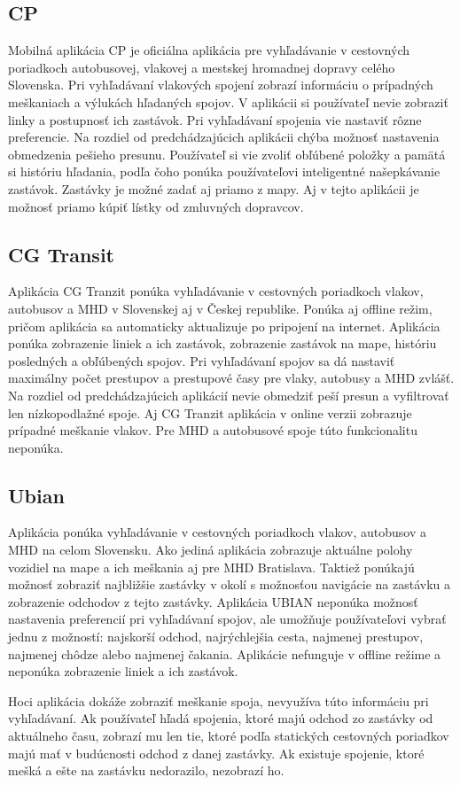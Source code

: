 \subsection{CP}
Mobilná aplikácia CP je oficiálna aplikácia pre vyhľadávanie v cestovných poriadkoch autobusovej, vlakovej a mestskej hromadnej dopravy celého Slovenska.  Pri vyhľadávaní vlakových spojení zobrazí informáciu o prípadných meškaniach a výlukách hľadaných spojov. V aplikácii si používateľ nevie zobraziť linky a postupnosť ich zastávok. Pri vyhľadávaní spojenia vie nastaviť rôzne preferencie. Na rozdiel od predchádzajúcich aplikácii chýba možnosť nastavenia obmedzenia pešieho presunu. Používateľ si vie zvoliť obľúbené položky a pamätá si históriu hľadania, podľa čoho ponúka používateľovi inteligentné našepkávanie zastávok. Zastávky je možné zadať aj priamo z mapy. Aj v tejto aplikácii je možnosť priamo kúpiť lístky od zmluvných dopravcov.

\subsection{CG Transit}
Aplikácia CG Tranzit ponúka vyhľadávanie v cestovných poriadkoch vlakov, autobusov a MHD v Slovenskej aj v Českej republike. Ponúka aj offline režim, pričom aplikácia sa automaticky aktualizuje po pripojení na internet. Aplikácia ponúka zobrazenie liniek a ich zastávok, zobrazenie zastávok na mape, históriu posledných a obľúbených spojov. Pri vyhľadávaní spojov sa dá nastaviť maximálny počet prestupov a prestupové časy pre vlaky, autobusy a MHD zvlášť. Na rozdiel od predchádzajúcich aplikácií nevie obmedziť peší presun a vyfiltrovať len nízkopodlažné spoje. Aj CG Tranzit aplikácia v online verzii zobrazuje prípadné meškanie vlakov. Pre MHD a autobusové spoje túto funkcionalitu neponúka.

\subsection{Ubian}
Aplikácia ponúka vyhľadávanie v cestovných poriadkoch vlakov, autobusov a MHD na celom Slovensku. Ako jediná aplikácia zobrazuje aktuálne polohy vozidiel na mape a ich meškania aj pre MHD Bratislava. Taktiež ponúkajú možnosť zobraziť najbližšie zastávky v okolí s možnosťou navigácie na zastávku a zobrazenie odchodov z tejto zastávky. Aplikácia UBIAN neponúka možnosť nastavenia preferencií pri vyhľadávaní spojov, ale umožňuje používateľovi vybrať jednu z možností: najskorší odchod, najrýchlejšia cesta, najmenej prestupov, najmenej chôdze alebo najmenej čakania. Aplikácie nefunguje v offline režime a neponúka zobrazenie liniek a ich zastávok.

Hoci aplikácia dokáže zobraziť meškanie spoja, nevyužíva túto informáciu pri vyhľadávaní. Ak používateľ hľadá spojenia, ktoré majú odchod zo zastávky od aktuálneho času, zobrazí mu len tie, ktoré podľa statických cestovných poriadkov majú mať v budúcnosti odchod z danej zastávky. Ak existuje spojenie, ktoré mešká a ešte na zastávku nedorazilo, nezobrazí ho.



